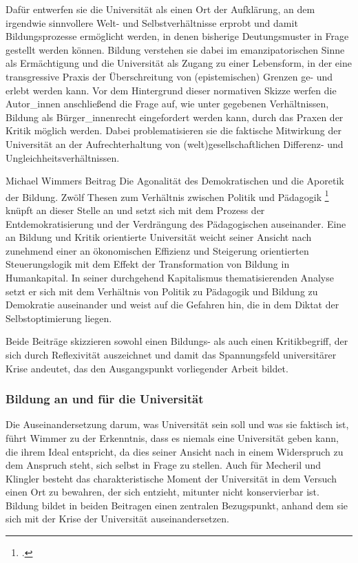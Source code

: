 \documentclass[11pt]{article}
\begin{document}
Dafür entwerfen sie die Universität als
einen Ort der Aufklärung, an dem \glqq irgendwie sinnvollere Welt- und
Selbstverhältnisse \grqq \footnotemark {} erprobt und damit Bildungsprozesse ermöglicht werden, in denen bisherige Deutungsmuster in Frage gestellt werden können. Bildung
verstehen sie dabei im emanzipatorischen Sinne als Ermächtigung und die
Universität als Zugang zu einer Lebensform, in der eine transgressive Praxis
der Überschreitung von (epistemischen) Grenzen ge- und erlebt werden kann. Vor
dem Hintergrund dieser normativen Skizze werfen die Autor\_innen anschließend
die Frage auf, wie unter gegebenen Verhältnissen, Bildung als Bürger\_innenrecht
eingefordert werden kann, durch das Praxen der Kritik möglich werden. Dabei
problematisieren sie die faktische Mitwirkung der Universität an der
Aufrechterhaltung von (welt)gesellschaftlichen Differenz- und
Ungleichheitsverhältnissen.

Michael Wimmers Beitrag \glqq Die Agonalität des
Demokratischen und die Aporetik der Bildung. Zwölf Thesen zum Verhältnis
zwischen Politik und Pädagogik \grqq \footnotemark \footcitetext{wimmer} knüpft
an dieser Stelle an und setzt sich mit dem Prozess der Entdemokratisierung und
der Verdrängung des Pädagogischen \footnotemark {} auseinander. Eine an Bildung und Kritik
orientierte Universität weicht seiner Ansicht nach zunehmend \glqq einer an
ökonomischen Effizienz und Steigerung orientierten Steuerungslogik \grqq
\footnotemark {} mit dem
Effekt der Transformation von Bildung in Humankapital. In seiner durchgehend
Kapitalismus thematisierenden Analyse setzt er sich mit dem Verhältnis von
Politik zu Pädagogik und Bildung zu Demokratie auseinander und weist auf die
Gefahren hin, die in dem Diktat der Selbstoptimierung liegen.

Beide Beiträge skizzieren sowohl einen Bildungs- als auch einen Kritikbegriff, der sich durch
Reflexivität auszeichnet und damit das Spannungsfeld universitärer Krise
andeutet, das den Ausgangspunkt vorliegender Arbeit bildet. 

\subsubsection{Bildung an und für die Universität}

Die Auseinandersetzung darum, was Universität sein soll und was sie faktisch
ist, führt Wimmer zu der Erkenntnis, dass es niemals eine Universität geben
kann, die ihrem Ideal entspricht, da dies seiner Ansicht nach in einem
Widerspruch zu dem Anspruch steht, sich selbst in Frage zu
stellen.\footnotemark {} Auch für
Mecheril und Klingler besteht das charakteristische Moment der Universität in
dem Versuch einen Ort zu bewahren, \glqq der sich entzieht, mitunter nicht
konservierbar ist.\grqq \footnotemark {} Bildung bildet in beiden Beitragen einen zentralen
Bezugspunkt, anhand dem sie sich mit der Krise der Universität
auseinandersetzen.
\end{document}
